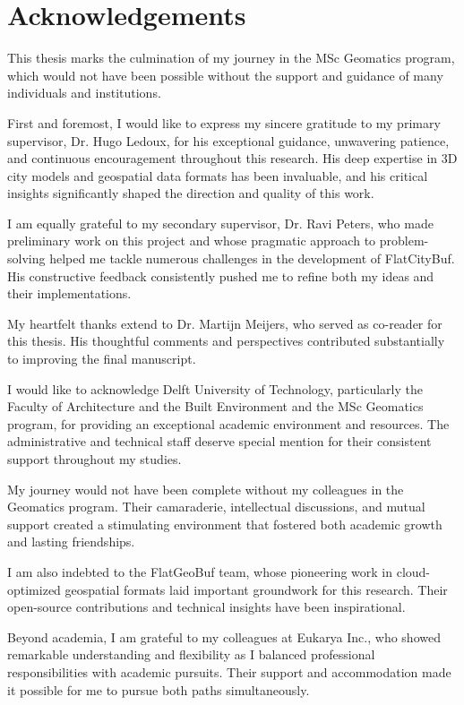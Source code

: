 \chapter*{Acknowledgements}

This thesis marks the culmination of my journey in the MSc Geomatics program, which would not have been possible without the support and guidance of many individuals and institutions.

First and foremost, I would like to express my sincere gratitude to my primary supervisor, Dr. Hugo Ledoux, for his exceptional guidance, unwavering patience, and continuous encouragement throughout this research. His deep expertise in 3D city models and geospatial data formats has been invaluable, and his critical insights significantly shaped the direction and quality of this work.

I am equally grateful to my secondary supervisor, Dr. Ravi Peters, who made preliminary work on this project and whose pragmatic approach to problem-solving helped me tackle numerous challenges in the development of FlatCityBuf. His constructive feedback consistently pushed me to refine both my ideas and their implementations.

My heartfelt thanks extend to Dr. Martijn Meijers, who served as co-reader for this thesis. His thoughtful comments and perspectives contributed substantially to improving the final manuscript.

I would like to acknowledge Delft University of Technology, particularly the Faculty of Architecture and the Built Environment and the MSc Geomatics program, for providing an exceptional academic environment and resources. The administrative and technical staff deserve special mention for their consistent support throughout my studies.

My journey would not have been complete without my colleagues in the Geomatics program. Their camaraderie, intellectual discussions, and mutual support created a stimulating environment that fostered both academic growth and lasting friendships.

I am also indebted to the FlatGeoBuf team, whose pioneering work in cloud-optimized geospatial formats laid important groundwork for this research. Their open-source contributions and technical insights have been inspirational.

Beyond academia, I am grateful to my colleagues at Eukarya Inc., who showed remarkable understanding and flexibility as I balanced professional responsibilities with academic pursuits. Their support and accommodation made it possible for me to pursue both paths simultaneously.

